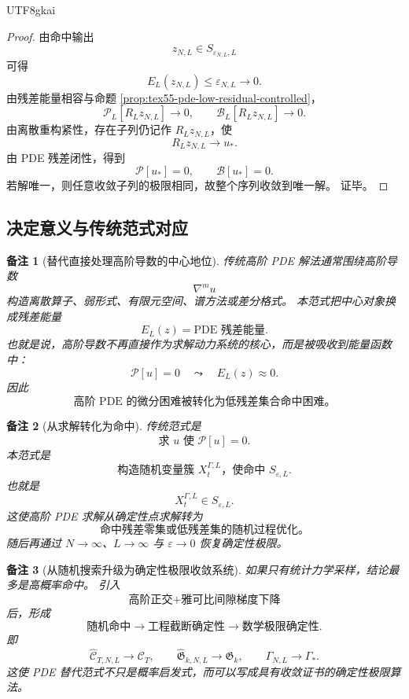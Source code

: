 \documentclass[12pt]{article}
\newtheorem{remark}{备注}[section]
\begin{document}
\begin{CJK*}{UTF8}{gkai}
\begin{proof}
由命中输出
\[
  z_{N,L}\in S_{\varepsilon_{N,L},L}
\]
可得
\[
  E_L(z_{N,L})\le\varepsilon_{N,L}\to0.
\]
由残差能量相容与命题 \ref{prop:tex55-pde-low-residual-controlled}，
\[
  \mathcal P_L[R_Lz_{N,L}]\to0,
  \qquad
  \mathcal B_L[R_Lz_{N,L}]\to0.
\]
由离散重构紧性，存在子列仍记作 \(R_Lz_{N,L}\)，使
\[
  R_Lz_{N,L}\to u_*.
\]
由 PDE 残差闭性，得到
\[
  \mathcal P[u_*]=0,
  \qquad
  \mathcal B[u_*]=0.
\]
若解唯一，则任意收敛子列的极限相同，故整个序列收敛到唯一解。
证毕。
\end{proof}

\subsection{决定意义与传统范式对应}
\label{subsec:tex55-pde-significance}

\begin{remark}[替代直接处理高阶导数的中心地位]
传统高阶 PDE 解法通常围绕高阶导数
\[
  \nabla^m u
\]
构造离散算子、弱形式、有限元空间、谱方法或差分格式。
本范式把中心对象换成残差能量
\[
  E_L(z)=\text{PDE 残差能量}.
\]
也就是说，高阶导数不再直接作为求解动力系统的核心，而是被吸收到能量函数中：
\[
  \mathcal P[u]=0
  \quad
  \leadsto
  \quad
  E_L(z)\approx0.
\]
因此
\[
  \boxed{
  \text{高阶 PDE 的微分困难被转化为低残差集合命中困难。}
  }
\]
\end{remark}

\begin{remark}[从求解转化为命中]
传统范式是
\[
  \text{求 }u\text{ 使 }\mathcal P[u]=0.
\]
本范式是
\[
  \text{构造随机变量簇 }X_t^{\Gamma,L}
  \text{，使命中 }S_{\varepsilon,L}.
\]
也就是
\[
  X_t^{\Gamma,L}\in S_{\varepsilon,L}.
\]
这使高阶 PDE 求解从确定性点求解转为
\[
  \boxed{
  \text{命中残差零集或低残差集的随机过程优化。}
  }
\]
随后再通过 \(N\to\infty\)、\(L\to\infty\) 与 \(\varepsilon\to0\) 恢复确定性极限。
\end{remark}

\begin{remark}[从随机搜索升级为确定性极限收敛系统]
如果只有统计力学采样，结论最多是高概率命中。
引入
\[
  \text{高阶正交}
  +
  \text{雅可比间隙梯度下降}
\]
后，形成
\[
  \text{随机命中}
  \to
  \text{工程截断确定性}
  \to
  \text{数学极限确定性}.
\]
即
\[
  \widehat{\mathcal C}_{T,N,L}\to\mathcal C_T,
  \qquad
  \widehat{\mathfrak G}_{k,N,L}\to\mathfrak G_k,
  \qquad
  \Gamma_{N,L}\to\Gamma_*.
\]
这使 PDE 替代范式不只是概率启发式，而可以写成具有收敛证书的确定性极限算法。
\end{remark}


\end{CJK*}
\end{document}
